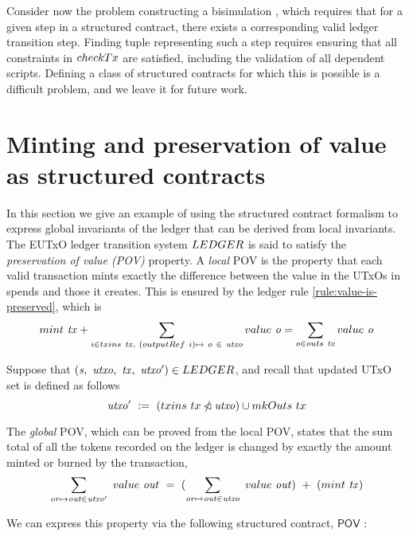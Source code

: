Consider now the problem constructing a bisimulation \cite{milner-pibook}, which
requires that for a given step in a structured
contract, there exists a corresponding valid ledger transition step. Finding tuple
representing such a step requires ensuring that all constraints in $\fun{checkTx}$
are satisfied, including
the validation of all dependent scripts. Defining a class of structured contracts for which
this is possible is a difficult problem, and we leave it for future work.

\section{Minting and preservation of value as structured contracts}
\label{sec:pov}

In this section we give an example of using the structured contract
formalism to express global invariants of the ledger that
can be derived from local invariants.
The EUTxO ledger transition system $\LEDGER$ is said to satisfy the
\emph{preservation of value (POV)} property. A \emph{local} POV is
the property that each valid transaction mints exactly the difference
between the value in the UTxOs in spends and those it creates.
This is ensured by the ledger rule \ref{rule:value-is-preserved}, which is
\[ \mint~\var{tx} + \sum_{i \in \inputs~\var{tx},~(\outputref~i)\mapsto~o~\in~\var{utxo}} \val~\var{o} = \sum_{o \in \outputs~\var{tx}} \val~\var{o} \]

Suppose that $(\var{s},~\var{utxo},~\var{tx},~\var{utxo'}) \in \LEDGER$, and
recall that updated UTxO set is defined as follows
\[ \var{utxo'}~\leteq~(\fun{txins}~{tx} \subtractdom \var{utxo}) \cup \fun{mkOuts}~{tx} \]

The \emph{global} POV, which can be proved from the local POV,
states that the sum total of all the tokens
recorded on the ledger is changed by exactly the amount minted or burned by the
transaction,
\[ \sum_{\var{or}\mapsto \var{out}\in \var{utxo'}}~\val~\var{out} ~= ~(\sum_{\var{or}\mapsto \var{out}\in \var{utxo}}~\val~\var{out}) ~+~(\fun{mint}~ \var{tx}) \]

We can express this property via the following structured contract, $\mathsf{POV}$ : \newline

